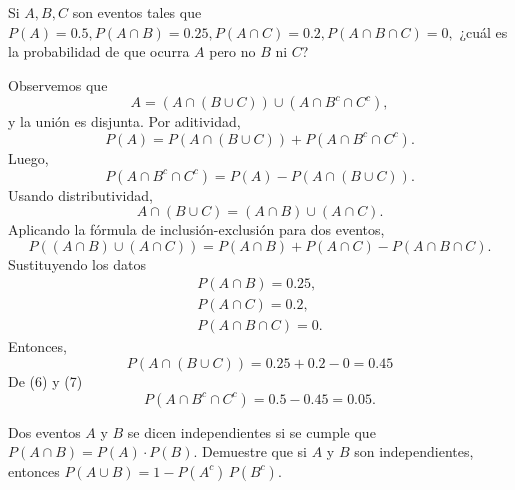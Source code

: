 \documentclass[12pt,a4paper]{article}
\begin{document}
    \begin{mdframed}[style=mdbluebox,frametitle={Ejercicio 4}]
        Si $A, B, C$ son eventos tales que $P(A) = 0.5, P(A \cap B) = 0.25, P(A \cap C) = 0.2, P(A \cap B \cap C) = 0,$
        ¿cuál es la probabilidad de que ocurra $A$ pero no $B$ ni $C$?
    \end{mdframed}

    \begin{solucion}
        Observemos que
        \begin{equation*}
            A=(A\cap(B\cup C))\cup(A\cap B^{c}\cap C^{c}),
        \end{equation*}
        y la unión es disjunta. Por aditividad,
        \begin{equation*}
            P(A)=P(A\cap(B\cup C))+P(A\cap B^{c}\cap C^{c}).
        \end{equation*}
        Luego,
        \begin{equation}
            P(A\cap B^{c}\cap C^{c})=P(A)-P(A\cap(B\cup C)).
        \end{equation}
        Usando distributividad,
        \begin{equation*}
            A\cap(B\cup C)=(A\cap B)\cup(A\cap C).
        \end{equation*}
        Aplicando la fórmula de inclusión-exclusión para dos eventos,
        \begin{equation*}
            P((A\cap B)\cup(A\cap C))=P(A\cap B)+P(A\cap C)-P(A\cap B\cap C).
        \end{equation*}
        Sustituyendo los datos
        \begin{align*}
            P(A\cap B)=0.25,\\
            P(A\cap C)=0.2,\\
            P(A\cap B\cap C)=0.
        \end{align*}
        Entonces,
        \begin{equation}
            P(A\cap(B\cup C))=0.25+0.2-0=0.45
        \end{equation}
        De (6) y (7)
        \begin{equation*}
            P(A\cap B^{c}\cap C^{c})=0.5-0.45=0.05.
        \end{equation*}
    \end{solucion}

    \begin{mdframed}[style=mdbluebox,frametitle={Ejercicio 5}]
        Dos eventos $A$ y $B$ se dicen independientes si se cumple que $P(A \cap B) = P(A) \cdot P(B).$
        Demuestre que si $A$ y $B$ son independientes, entonces $P(A \cup B) = 1 - P(A^c)\, P(B^c).$
    \end{mdframed}
\end{document}
